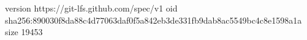 version https://git-lfs.github.com/spec/v1
oid sha256:890030f8da88c4d77063daf0f5a842eb3de331fb9dab8ac5549bc4c8e1598a1a
size 19453
